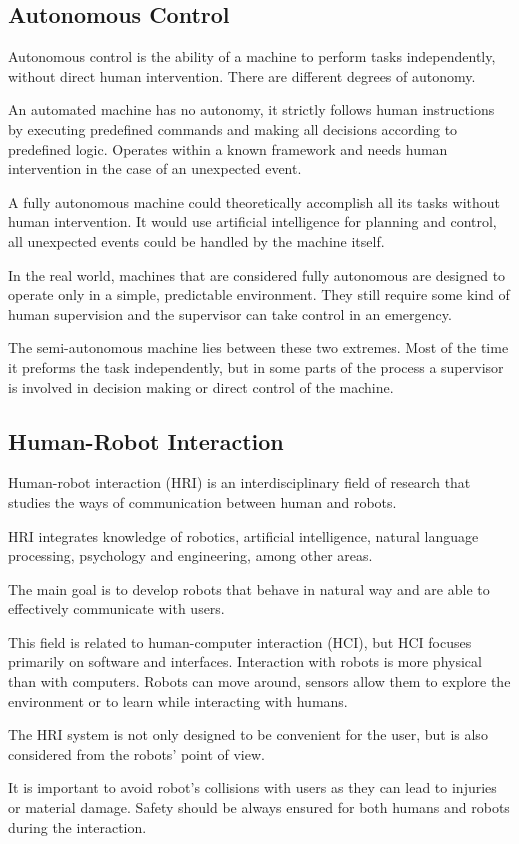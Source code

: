 \subsection{Autonomous Control}
Autonomous control is the ability of a machine to perform tasks independently, without direct human intervention. There are different degrees of autonomy.\par
An automated machine has no autonomy, it strictly follows human instructions by executing predefined commands and making all decisions according to predefined logic. Operates within a known framework and needs human intervention in the case of an unexpected event.\par
A fully autonomous machine could theoretically accomplish all its tasks without human intervention. It would use artificial intelligence for planning and control, 
all unexpected events could be handled by the machine itself.\par
In the real world, machines that are considered fully autonomous are designed to operate only in a simple, predictable environment. They still require some kind of human supervision and the supervisor can take control in an emergency.\par
The semi-autonomous machine lies between these two extremes. Most of the time it preforms the task independently, but in some parts of the process a supervisor is involved in decision making or direct control of the machine.\par


\subsection{Human-Robot Interaction}
Human-robot interaction (HRI) is an interdisciplinary field of research that studies the ways of communication between human and robots.\par
HRI integrates knowledge of robotics, artificial intelligence, natural language processing, psychology and engineering, among other areas.\par
The main goal is to develop robots that behave in natural way and are able to effectively communicate with users.\par
This field is related to human-computer interaction (HCI), but HCI focuses primarily on software and interfaces. Interaction with robots is more physical than with computers. Robots can move around, sensors allow them to explore the environment or to learn while interacting with humans.\par
The HRI system is not only designed to be convenient for the user, but is also considered from the robots' point of view.\par
It is important to avoid robot's collisions with users as they can lead to injuries or material damage. Safety should be always ensured for both humans and robots during the interaction.\par

